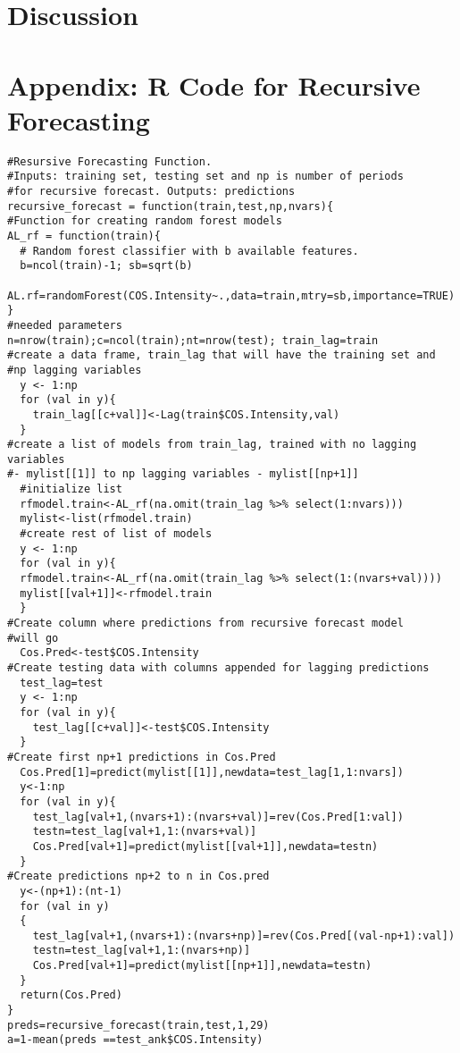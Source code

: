 \documentclass[12pt]{article}
\begin{document}
\section{Discussion}





\section{Appendix: R Code for Recursive Forecasting}
\begin{lstlisting}
#Resursive Forecasting Function.
#Inputs: training set, testing set and np is number of periods
#for recursive forecast. Outputs: predictions
recursive_forecast = function(train,test,np,nvars){
#Function for creating random forest models
AL_rf = function(train){
  # Random forest classifier with b available features.
  b=ncol(train)-1; sb=sqrt(b)
  AL.rf=randomForest(COS.Intensity~.,data=train,mtry=sb,importance=TRUE)
}
#needed parameters
n=nrow(train);c=ncol(train);nt=nrow(test); train_lag=train
#create a data frame, train_lag that will have the training set and
#np lagging variables
  y <- 1:np
  for (val in y){
    train_lag[[c+val]]<-Lag(train$COS.Intensity,val)
  }
#create a list of models from train_lag, trained with no lagging variables
#- mylist[[1]] to np lagging variables - mylist[[np+1]]
  #initialize list
  rfmodel.train<-AL_rf(na.omit(train_lag %>% select(1:nvars)))
  mylist<-list(rfmodel.train)
  #create rest of list of models
  y <- 1:np
  for (val in y){
  rfmodel.train<-AL_rf(na.omit(train_lag %>% select(1:(nvars+val))))
  mylist[[val+1]]<-rfmodel.train
  }
#Create column where predictions from recursive forecast model
#will go
  Cos.Pred<-test$COS.Intensity
#Create testing data with columns appended for lagging predictions
  test_lag=test
  y <- 1:np
  for (val in y){
    test_lag[[c+val]]<-test$COS.Intensity
  }
#Create first np+1 predictions in Cos.Pred
  Cos.Pred[1]=predict(mylist[[1]],newdata=test_lag[1,1:nvars])
  y<-1:np
  for (val in y){
    test_lag[val+1,(nvars+1):(nvars+val)]=rev(Cos.Pred[1:val])
    testn=test_lag[val+1,1:(nvars+val)]
    Cos.Pred[val+1]=predict(mylist[[val+1]],newdata=testn)
  }
#Create predictions np+2 to n in Cos.pred
  y<-(np+1):(nt-1)
  for (val in y)
  {
    test_lag[val+1,(nvars+1):(nvars+np)]=rev(Cos.Pred[(val-np+1):val])
    testn=test_lag[val+1,1:(nvars+np)]
    Cos.Pred[val+1]=predict(mylist[[np+1]],newdata=testn)
  }
  return(Cos.Pred)
}
preds=recursive_forecast(train,test,1,29)
a=1-mean(preds ==test_ank$COS.Intensity)

\end{lstlisting}
\end{document}
